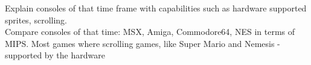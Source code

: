 \documentclass[book.tex]{subfiles}
\begin{document}
\label{chapter_console}
Explain consoles of that time frame with capabilities such as hardware supported sprites, scrolling.\\
Compare consoles of that time: MSX, Amiga, Commodore64, NES in terms of MIPS.
Most games where scrolling games, like Super Mario and Nemesis - supported by the hardware
\end{document}
